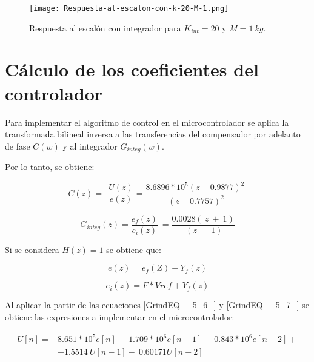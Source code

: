 \begin{figure}[H]
	\centering
	\texttt{[image: Respuesta-al-escalon-con-k-20-M-1.png]}
	\caption{Respuesta al escalón con integrador para $K_{int} =20$ y $M=1\:kg$.}
	\label{fig:respuesta-al-escalon-con-k-20-M-1}
\end{figure}


\section{Cálculo de los coeficientes del controlador}

\noindent Para implementar el algoritmo de control en el microcontrolador se aplica la transformada bilineal inversa a las transferencias del compensador por adelanto de fase $C(w)$ y al integrador $G_{integ}(w)$.

\noindent Por lo tanto, se obtiene:

\begin{equation} \label{GrindEQ__5_6_} 
	C(z)=\ \ \frac{U(z)}{e(z)}=\frac{8.6896*10^5(z-0.9877)^2}{\ (z-0.7757)^2}\  
\end{equation} 

\begin{equation} \label{GrindEQ__5_7_} 
	G_{integ}(z)=\frac{e_f(z)}{e_i(z)}\ =\frac{0.0028(\ z\ +\ 1)}{\ (z\ -\ 1)} 
\end{equation} 

\noindent Si se considera $H(z)=1$ se obtiene que:

\begin{equation} \label{GrindEQ__5_39_} 
	e(z)=e_f(Z)+Y_f(z) 
\end{equation} 

\begin{equation} \label{GrindEQ__5_40_} 
	e_i(z)=F*Vref+Y_f(z) 
\end{equation} 


\noindent Al aplicar la partir de las ecuaciones \ref{GrindEQ__5_6_} y \ref{GrindEQ__5_7_} se obtiene las expresiones a implementar en el microcontrolador:

\begin{equation} 
	\begin{aligned}\label{eq_U-coef}
	U[n]=&8.651*10^5e[n]-\ 1.709*10^6e[n-1]+\ 0.843*10^6e[n-2]+\\
		 &+1.5514\ U[n-1]-\ 0.60171U[n-2]\\ 
	\end{aligned}
\end{equation}

